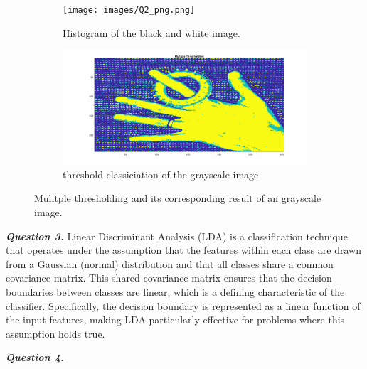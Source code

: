 \documentclass[12pt]{article}
\begin{document}
\begin{figure}[h!]
  \begin{subfigure}[b]{0.5\textwidth}
       \centering
       \texttt{[image: images/Q2\_png.png]}
       \caption{Histogram of the black and white image.}
       \label{fig:Q2_hist}
   \end{subfigure}
   \hfill
   \begin{subfigure}[b]{0.5\textwidth}
       \centering
       \includegraphics[width=0.9\linewidth]{images/Q2.png}
       \caption{threshold classiciation of the grayscale image}
       \label{fig:Q2_im}
   \end{subfigure}
      \caption{Mulitple thresholding and its corresponding result of an grayscale image.}
      \label{fig:Q2}
\end{figure}


\textbf{\emph{Question 3.}}
Linear Discriminant Analysis (LDA) is a classification technique that operates under the assumption that the features within each class are drawn from a Gaussian (normal) distribution and that all classes share a common covariance matrix. This shared covariance matrix ensures that the decision boundaries between classes are linear, which is a defining characteristic of the classifier. Specifically, the decision boundary is represented as a linear function of the input features, making LDA particularly effective for problems where this assumption holds true.

\textbf{\emph{Question 4.}}
\end{document}
